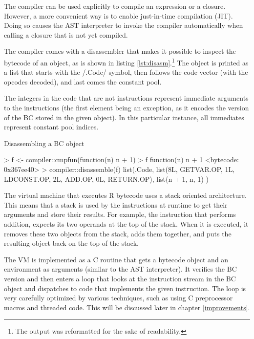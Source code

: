 {The compiler can be used explicitly to compile an expression or a closure. However, a more convenient way is to enable just-in-time compilation (JIT). Doing so causes the AST interpreter to invoke the compiler automatically when calling a closure that is not yet compiled.

The compiler comes with a disassembler that makes it possible to inspect the bytecode of an object, as is shown in listing \ref{lst:disasm}.\footnote{The output was reformatted for the sake of readability.} The object is printed as a list that starts with the \rinline/.Code/ symbol, then follows the code vector (with the opcodes decoded), and last comes the constant pool.

The integers in the code that are not instructions represent immediate arguments to the instructions (the first element being an exception, as it encodes the version of the BC stored in the given object). In this particular instance, all immediates represent constant pool indices.

\begin{listing}[htbp]
  \caption{\label{lst:disasm}Disassembling a BC object}
  \begin{rcode}
> f <- compiler::cmpfun(function(n) n + 1)
> f
function(n) n + 1
<bytecode: 0x367ee40>
> compiler::disassemble(f)
list(.Code,
     list(8L,
          GETVAR.OP, 1L,
          LDCONST.OP, 2L,
          ADD.OP, 0L,
          RETURN.OP),
     list(n + 1,
          n,
          1)
)
  \end{rcode}
\end{listing}

The virtual machine that executes R bytecode uses a stack oriented architecture. This means that a stack is used by the instructions at runtime to get their arguments and store their results. For example, the instruction that performs addition, expects its two operands at the top of the stack. When it is executed, it removes these two objects from the stack, adds them together, and puts the resulting object back on the top of the stack.

The VM is implemented as a C routine that gets a bytecode object and an environment as arguments (similar to the AST interpreter). It verifies the BC version and then enters a loop that looks at the instruction stream in the BC object and dispatches to code that implements the given instruction. The loop is very carefully optimized by various techniques, such as using C preprocessor macros and threaded code. This will be discussed later in chapter \ref{improvements}.

}
